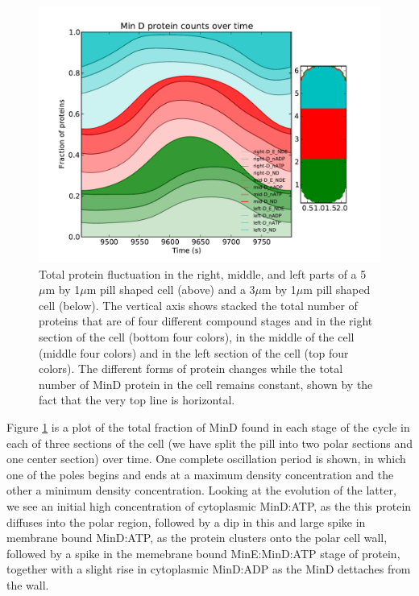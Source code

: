 \documentclass[letterpaper,twocolumn,amsmath,amssymb,pre]{revtex4-1}
\newcommand\micron{\ensuremath{\mu\text{m}}}
\begin{document}
\begin{figure}
  \includegraphics[width=\columnwidth]{../data/shape-p/plots/box-plot_D--p-200-50-0-0-1500}
  \caption{Total protein fluctuation in the right, middle, and left
    parts of a 5$\micron$ by 1$\micron$ pill shaped cell (above) and a
    3$\micron$ by 1$\micron$ pill shaped cell (below).  The vertical axis shows
    stacked the total number of proteins that are of four different
    compound stages and in the right section of the cell (bottom four
    colors), in the middle of the cell (middle four colors) and in the
    left section of the cell (top four colors). The different forms of
    protein changes while the total number of MinD protein in the cell
    remains constant, shown by the fact that the very top line is
    horizontal.}
  \label{box-p}
\end{figure}

Figure \ref{box-p} is a plot of the total fraction of
MinD found in each stage of the cycle in each of three sections of the
cell (we have split the pill into two polar sections and one center
section) over time.  One complete oscillation period is shown, in
which one of the poles begins and ends at a maximum density
concentration and the other a minimum density concentration.  Looking
at the evolution of the latter, we see an initial high concentration
of cytoplasmic MinD:ATP, as the this protein diffuses into the polar
region, followed by a dip in this and large spike in membrane bound
MinD:ATP, as the protein clusters onto the polar cell wall, followed
by a spike in the memebrane bound MinE:MinD:ATP stage of protein,
together with a slight rise in cytoplasmic MinD:ADP as the MinD
dettaches from the wall.
\end{document}
